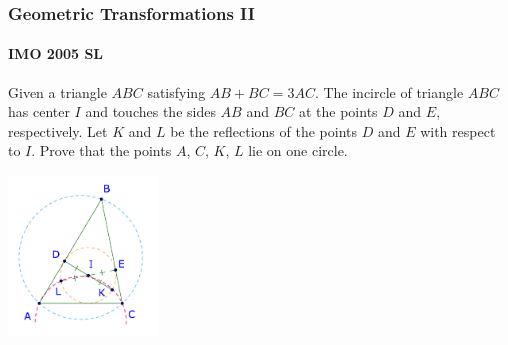 \documentclass[8pt,xcolor=table,dvipsnames]{beamer}
\begin{document}
\begin{frame}[t]
    \frametitle{Geometric Transformations II}
    \framesubtitle{IMO 2005 SL}
    \begin{example}
        Given a triangle $ABC$ satisfying $AB+BC=3 AC$.
        The incircle of triangle $ABC$ has center $I$ and touches the sides $AB$ and $BC$ at the points $D$ and $E$, respectively.
        Let $K$ and $L$ be the reflections of the points $D$ and $E$ with respect to $I$.
        \bigbreak
        Prove that the points $A$, $C$, $K$, $L$ lie on one circle.
    \end{example}

    \begin{center}
        \includegraphics[width=4cm]{./svg/pdf/imo-sl-2005-g1.pdf}
    \end{center}
\end{frame}
\end{document}
